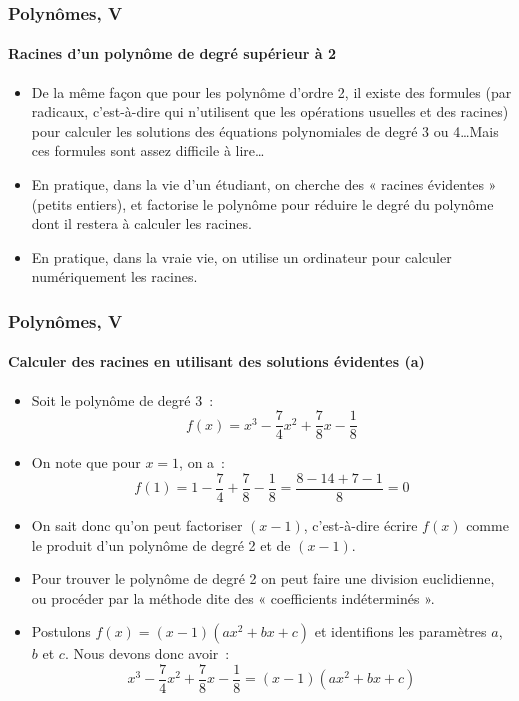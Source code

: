 \documentclass[10pt,notheorems]{beamer}
\theoremstyle{plain}
\theoremstyle{definition} %
\begin{document}
\begin{frame}
  \frametitle{Polynômes, V}
  \framesubtitle{Racines d'un polynôme de degré supérieur à 2}
  \hypertarget{slide_polynome_2_racines_5_1}{}

  \bigskip

  \begin{itemize}

  \item De la même façon que pour les polynôme d'ordre 2, il existe des formules (par radicaux, c'est-à-dire qui n'utilisent que les opérations usuelles et des racines) pour calculer les solutions des équations  polynomiales de degré 3 ou 4\ldots Mais ces formules sont assez difficile à lire\ldots\newline

  \item En pratique, dans la vie d'un étudiant, on cherche des « racines évidentes » (petits entiers), et factorise le  polynôme pour réduire le degré du polynôme dont il restera à calculer les racines.\newline

  \item En pratique, dans la vraie vie, on utilise un ordinateur pour calculer numériquement les racines.\newline

  \end{itemize}

\end{frame}


\begin{frame}
  \frametitle{Polynômes, V}
  \framesubtitle{Calculer des racines en utilisant des solutions évidentes (a)}
  \hypertarget{slide_polynome_2_racines_5_2}{}

  \bigskip

  \begin{itemize}

  \item Soit le polynôme de degré 3~:
    \[
      f(x) = x^3-\frac{7}{4}x^2 + \frac{7}{8}x - \frac{1}{8}
    \]

  \item On note que pour $x=1$, on a~:
    \[
      f(1) = 1-\frac{7}{4}+\frac{7}{8} -\frac{1}{8} = \frac{8-14+7-1}{8} = 0
    \]

  \item On sait donc qu'on peut factoriser $(x-1)$, c'est-à-dire écrire $f(x)$ comme le produit d'un polynôme de degré 2 et de $(x-1)$.\newline

  \item Pour trouver le polynôme de degré 2 on peut faire une division euclidienne, ou procéder par la méthode dite des « coefficients indéterminés ».\newline

  \item Postulons $f(x) = (x-1)(ax^2+bx+c)$ et identifions les paramètres $a$, $b$ et $c$. Nous devons donc avoir~:
    \[
      x^3-\frac{7}{4}x^2+\frac{7}{8}x -\frac{1}{8} = (x-1)(ax^2+bx+c)
    \]

  \end{itemize}

\end{frame}
\end{document}

